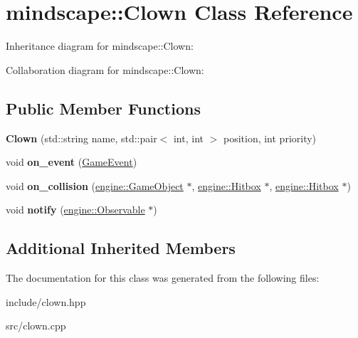 \hypertarget{classmindscape_1_1_clown}{}\section{mindscape\+:\+:Clown Class Reference}
\label{classmindscape_1_1_clown}


Inheritance diagram for mindscape\+:\+:Clown\+:


Collaboration diagram for mindscape\+:\+:Clown\+:
\subsection*{Public Member Functions}
\begin{DoxyCompactItemize}
\item 
{\bfseries Clown} (std\+::string name, std\+::pair$<$ int, int $>$ position, int priority)\hypertarget{classmindscape_1_1_clown_a193ba548dc86723e9f9dc3837b303dcf}{}\label{classmindscape_1_1_clown_a193ba548dc86723e9f9dc3837b303dcf}

\item 
void {\bfseries on\+\_\+event} (\hyperlink{class_game_event}{Game\+Event})\hypertarget{classmindscape_1_1_clown_a54e259fdb78e80ea53b8ff2c9c4d7e13}{}\label{classmindscape_1_1_clown_a54e259fdb78e80ea53b8ff2c9c4d7e13}

\item 
void {\bfseries on\+\_\+collision} (\hyperlink{classengine_1_1_game_object}{engine\+::\+Game\+Object} $\ast$, \hyperlink{classengine_1_1_hitbox}{engine\+::\+Hitbox} $\ast$, \hyperlink{classengine_1_1_hitbox}{engine\+::\+Hitbox} $\ast$)\hypertarget{classmindscape_1_1_clown_a738d25a413d4c112e4e98ef3d9da8520}{}\label{classmindscape_1_1_clown_a738d25a413d4c112e4e98ef3d9da8520}

\item 
void {\bfseries notify} (\hyperlink{classengine_1_1_observable}{engine\+::\+Observable} $\ast$)\hypertarget{classmindscape_1_1_clown_a0c5d3fc9f693402084cbcbc1b7110124}{}\label{classmindscape_1_1_clown_a0c5d3fc9f693402084cbcbc1b7110124}

\end{DoxyCompactItemize}
\subsection*{Additional Inherited Members}


The documentation for this class was generated from the following files\+:\begin{DoxyCompactItemize}
\item 
include/clown.\+hpp\item 
src/clown.\+cpp\end{DoxyCompactItemize}
